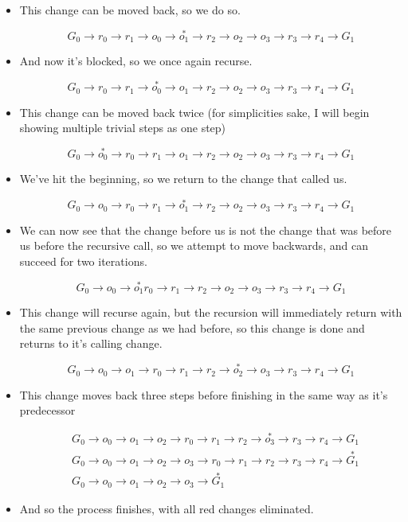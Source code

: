 \documentclass{article}
\begin{document}
\begin{itemize}
\item This change can be moved back, 
so we do so.

\[G_0\to r_0\to r_1\to o_0
\to \stackrel{*}{o_1}\to r_2 \to o_2 \to o_3
\to r_3 \to r_4 \to G_1\]

\item And now it's blocked, 
so we once again recurse.

\[G_0\to r_0\to r_1\to \stackrel{*}{o_0}
\to o_1\to r_2 \to o_2 \to o_3
\to r_3 \to r_4 \to G_1\]

\item This change can be moved back twice 
(for simplicities sake, 
I will begin showing multiple trivial steps as one step)

\[G_0\to \stackrel{*}{o_0}\to r_0\to r_1
\to o_1\to r_2 \to o_2 \to o_3
\to r_3\to r_4 \to G_1\]

\item We've hit the beginning, 
so we return to the change that called us.

\[G_0\to o_0\to r_0\to r_1
\to \stackrel{*}{o_1}\to r_2 \to o_2 \to o_3
\to r_3\to r_4 \to G_1\]

\item We can now see that the change before us 
is not the change that was before us 
before the recursive call, 
so we attempt to move backwards, 
and can succeed for two iterations.

\[G_0\to o_0\to \stackrel{*}{o_1} r_0
\to r_1 \to r_2 \to o_2 \to o_3
\to r_3\to r_4 \to G_1\]

\item This change will recurse again, 
but the recursion will immediately return 
with the same previous change 
as we had before, 
so this change is done 
and returns to it's calling change.

\[G_0\to o_0\to o_1\to r_0
\to r_1 \to r_2 \to \stackrel{*}{o_2}\to o_3
\to r_3\to r_4 \to G_1\]

\item This change moves back three steps 
before finishing in the same way as it's predecessor

\begin{align*}
&G_0\to o_0\to o_1\to o_2
\to r_0\to r_1 \to r_2 \to \stackrel{*}{o_3}\to
r_3\to r_4 \to G_1\\
&G_0\to o_0\to o_1\to o_2
\to o_3 \to r_0 \to r_1\to r_2
\to r_3 \to r_4 \to \stackrel{*}{G_1}\\
&G_0\to o_0\to o_1\to o_2
\to o_3 \to \stackrel{*}{G_1}
\end{align*}

\item And so the process finishes, 
with all red changes eliminated.
\end{itemize}
\end{document}

